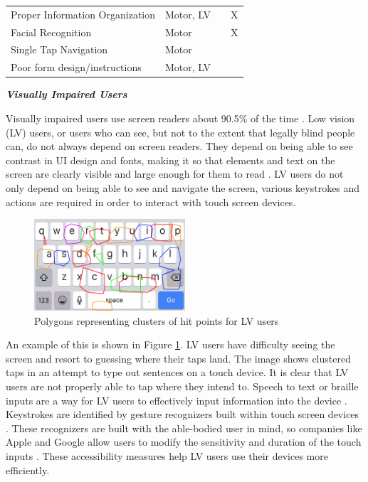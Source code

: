 \begin{table}[h]
\begin{tabular}{>{\centering\arraybackslash}p{2in}|>{\centering\arraybackslash}p{1.8in}|>{\centering\arraybackslash}p{.82in}|>{\centering\arraybackslash}p{.82in}}
		 Proper Information Organization & \footnotesize {Motor, LV} & \cite{Calvo16} & X \\
		\rowcolor{gray!30!} Facial Recognition & \footnotesize {Motor} & \cite{Calvo16, Astler11} & X \\
		 Single Tap Navigation & \footnotesize {Motor} & \cite{AppleAccess, GoogleAccess, HarvardAccess, WebGuide, FlrezAristizbal19, Milne18} &  \\
		\rowcolor{gray!30!} Poor form design/instructions & \footnotesize {Motor, LV} & \cite{ADAWeb, AccessGov} &  
		\end{tabular}
\vspace{-1em}
	\label{tab:guidelines}
\end{table}



\noindent \textbf{\textit{Visually Impaired Users}}

Visually impaired users use screen readers about 90.5\% of the time \cite{17}. Low vision (LV) users, or users who can see, but not to the extent that legally blind people can, do not always depend on screen readers. They depend on being able to see contrast in UI design and fonts, making it so that elements and text on the screen are clearly visible and large enough for them to read \cite{31}. LV users do not only depend on being able to see and navigate the screen, various keystrokes and actions are required in order to interact with touch screen devices. 

\begin{figure}
    \centering
    \includegraphics[width=0.5\textwidth]{imgs/hits.jpg}
    \caption{Polygons representing clusters of hit points for LV users \cite{4}}
    \label{fig:HitPoint}
\end{figure}

An example of this is shown in Figure \ref{fig:HitPoint}. LV users have difficulty seeing the screen and resort to guessing where their taps land. The image shows clustered taps in an attempt to type out sentences on a touch device. It is clear that LV users are not properly able to tap where they intend to. Speech to text \cite{25,26} or braille inputs are a way for LV users to effectively input information into the device \cite{33}. Keystrokes are identified by gesture recognizers built within touch screen devices \cite{12}. These recognizers are built with the able-bodied user in mind, so companies like Apple and Google allow users to modify the sensitivity and duration of the touch inputs \cite{12,25,26}. These accessibility measures help LV users use their devices more efficiently.\\ 

